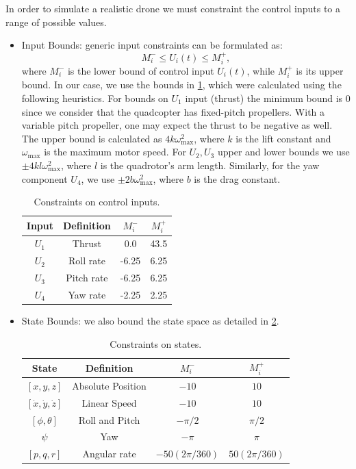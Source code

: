 In order to simulate a realistic drone we must constraint the control inputs to a range of possible values.
\begin{itemize}
  \item Input Bounds: generic input constraints can be formulated as: 
  $$M_{i}^{-} \leq U_{i}(t) \leq M_{i}^{+},$$
  where $M_{i}^{-}$ is the lower bound of control input $U_{i}(t)$, while $M_{i}^{+}$ is its upper bound.
  In our case, we use the bounds in \cref{tab:control_bounds}, which were calculated using the following heuristics.
  For bounds on $U_1$ input (thrust) the minimum bound is $0$ since we consider that the quadcopter has fixed-pitch propellers.
  With a variable pitch propeller, one may expect the thrust to be negative as well.
  The upper bound is calculated as $4 k \omega_{\text{max}}^{2}$, where $k$ is the lift constant and $\omega_{\text{max}}$ is the maximum motor speed.
  For $U_2, U_3$ upper and lower bounds we use $\pm 4 k l \omega_{\text{max}}^{2}$, where $l$ is the quadrotor's arm length.
  Similarly, for the yaw component $U_4$, we use  $\pm 2 b \omega_{\text{max}}^{2}$, where $b$ is the drag constant.
  \begin{table}[htbp]
    \center
    \begin{tabular}{|c|c|c|c|}
      \hline 
      Input & Definition & $M_i^{-}$ & $M_i^{+}$ \\
      \hline 
      {$U_1$} & {Thrust} & 0.0 & 43.5 \\
      {$U_2$} & {Roll rate} & -6.25 & 6.25 \\
      {$U_3$} & {Pitch rate} & -6.25 & 6.25\\
      {$U_4$} & {Yaw rate} & -2.25 & 2.25\\
      \hline
    \end{tabular}
    \caption{Constraints on control inputs.}
    \label{tab:control_bounds}
  \end{table}

  \item State Bounds: we also bound the state space as detailed in \cref{tab:state_bounds}.

  \begin{table}[htbp]
    \center
    \begin{tabular}{|c|c|c|c|}
      \hline 
      State & Definition & $M_i^{-}$ & $M_i^{+}$ \\
      \hline 
      {$[x, y, z]$} & {Absolute Position} & $-10$ & $10$ \\
      {$[\dot{x}, \dot{y}, \dot{z}]$} & {Linear Speed} & $-10$ & $10$ \\
      {$[\phi, \theta]$} & {Roll and Pitch} & $-\pi/2$ & $\pi/2$ \\
      {$\psi$} & {Yaw} & $-\pi$ & $\pi$ \\
      {$[p, q, r]$} & {Angular rate} & $-50(2\pi/360)$ & $50(2\pi/360)$\\
      \hline
    \end{tabular}
    \caption{Constraints on states.}
    \label{tab:state_bounds}
  \end{table}


\end{itemize}
